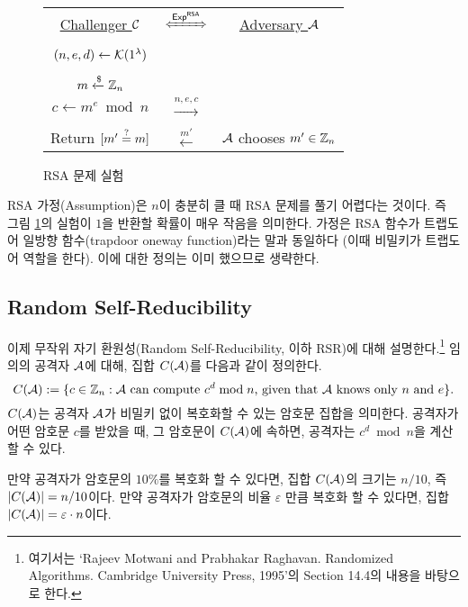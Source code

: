\begin{figure}[ht]
    \begin{tcolorbox}[colback=white]
        \centering
        \begin{tabularx}{\linewidth}{CcC}
            \underline{Challenger $\mathcal{C}$} & $\xLeftrightarrow{\EXP^{\RSA}}$ & \underline{Adversary $\mathcal{A}$} \\
            \\
            $(n, e, d) \gets \mathcal{K}(1^{\lambda})$ & & \\
            \\
            $m \xleftarrow{\$} \mathbb{Z}_n$ & & \\
            $c \gets m^e \bmod n$ & $\xrightarrow{n, e, c}$ & \\
            \\
            Return $[m' \overset{?}{=} m]$ & $\xleftarrow{m'}$ & $\mathcal{A}$ chooses $m' \in \mathbb{Z}_n$ \\
        \end{tabularx}
    \end{tcolorbox}
    \caption{RSA 문제 실험}
    \label{fig:rsa-problem}
\end{figure}

RSA 가정(Assumption)은 $n$이 충분히 클 때 RSA 문제를 풀기 어렵다는 것이다. 즉
그림 \ref{fig:rsa-problem}의 실험이 $1$을 반환할 확률이 매우 작음을 의미한다.
가정은 RSA 함수가 트랩도어 일방향 함수(trapdoor oneway function)라는 말과
동일하다 (이때 비밀키가 트랩도어 역할을 한다). 이에 대한 정의는 이미 했으므로
생략한다.

\subsection{Random Self-Reducibility}

이제 무작위 자기 환원성(Random Self-Reducibility, 이하 RSR)에 대해
설명한다.\footnote{여기서는 `Rajeev Motwani and Prabhakar Raghavan. Randomized
Algorithms. Cambridge University Press, 1995'의 Section 14.4의 내용을 바탕으로
한다.} 임의의 공격자 $\mathcal{A}$에 대해, 집합 $C(\mathcal{A})$를 다음과 같이 정의한다.
$$
    C(\mathcal{A}) := \{ c \in \mathbb{Z}_n : \mathcal{A} \text{ can compute $c^d \bmod n$, given that $\mathcal{A}$ knows only $n$ and $e$} \}.
$$
$C(\mathcal{A})$는 공격자 $\mathcal{A}$가 비밀키 없이 복호화할 수 있는 암호문 집합을 의미한다.
공격자가 어떤 암호문 $c$를 받았을 때, 그 암호문이 $C(\mathcal{A})$에 속하면, 공격자는
$c^d \bmod n$을 계산할 수 있다.

만약 공격자가 암호문의 $10\%$를 복호화 할 수 있다면, 집합 $C(\mathcal{A})$의 크기는
$n/10$, 즉 $|C(\mathcal{A})| = n/10$이다. 만약 공격자가 암호문의 비율 $\varepsilon$ 만큼
복호화 할 수 있다면, 집합 $|C(\mathcal{A})| = \varepsilon \cdot n$이다.

